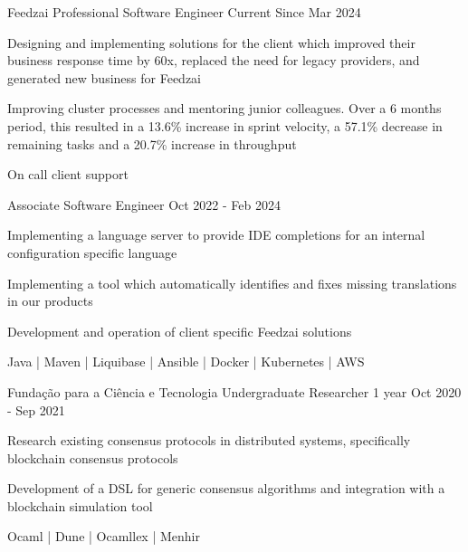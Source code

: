 


\begin{cventries}


\cventry
  {Feedzai} %
  {Professional Software Engineer} %
  {Current} %
  {Since Mar 2024} %
  {
    \begin{cvitems}
      \item{Designing and implementing solutions for the client which
        improved their business response time by 60x,
        replaced the need for legacy providers,
        and generated new business for Feedzai}
      \item{Improving cluster processes and mentoring junior colleagues.
        Over a 6 months period, this resulted in
        a 13.6\% increase in sprint velocity,
        a 57.1\% decrease in remaining tasks and
        a 20.7\% increase in throughput}
      \item{On call client support}
    \end{cvitems}
  }
  {}

\cventry
  {} %
  {Associate Software Engineer} %
  {} %
  {Oct 2022 - Feb 2024} %
  {
    \begin{cvitems}
      \item{Implementing a language server to provide IDE completions for an internal configuration specific language}
      \item{Implementing a tool which automatically identifies and fixes missing translations in our products}
      \item{Development and operation of client specific Feedzai solutions}
    \end{cvitems}
  }
  {Java | Maven | Liquibase | Ansible | Docker | Kubernetes | AWS}

\cventry
  {Fundação para a Ciência e Tecnologia} %
  {Undergraduate Researcher} %
  {1 year} %
  {Oct 2020 - Sep 2021} %
  {
    \begin{cvitems}
      \item{Research existing consensus protocols in distributed systems, specifically blockchain consensus protocols}
      \item{Development of a DSL for generic consensus algorithms and integration with a blockchain simulation tool}
    \end{cvitems}
  }
  {Ocaml | Dune | Ocamllex | Menhir}


\end{cventries}
